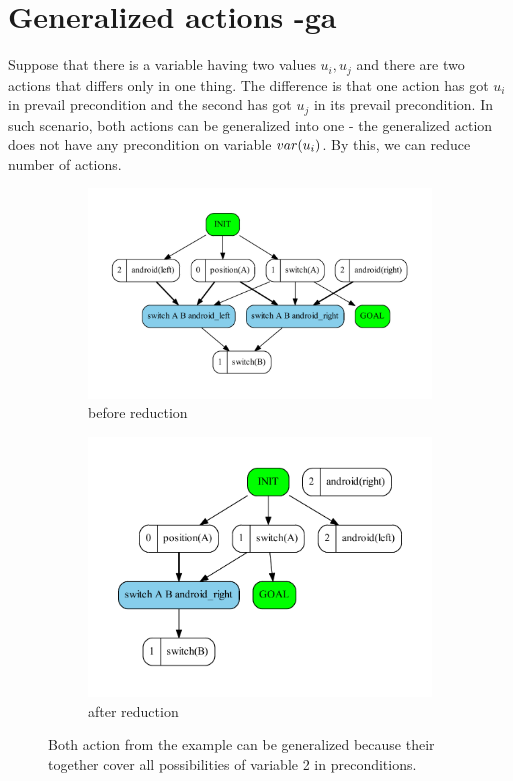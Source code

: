 \chapter{Generalized actions -ga}

	Suppose that there is a variable having two values $u_i, u_j$ and there are two actions that differs only in one thing. The difference is that one action has got $u_i$ in prevail precondition and the second has got $u_j$ in its prevail precondition. In such scenario, both actions can be generalized into one - the generalized action does not have any precondition on variable $var(u_i)$. By this, we can reduce number of actions.


	\begin{figure}
		\begin{subfigure}[b]{0.8\textwidth}
			\includegraphics[scale=0.5]{generalizeActions/figures/simple_input}
			\caption{before reduction}
		\end{subfigure}	
		
		\begin{subfigure}[b]{0.8\textwidth}
			\includegraphics[scale=0.5]{generalizeActions/figures/simple_output}
			\caption{after reduction}
		\end{subfigure}
		\caption{Both action from the example can be generalized because their together cover all possibilities of variable 2 in preconditions. }
	\end{figure}               
	

